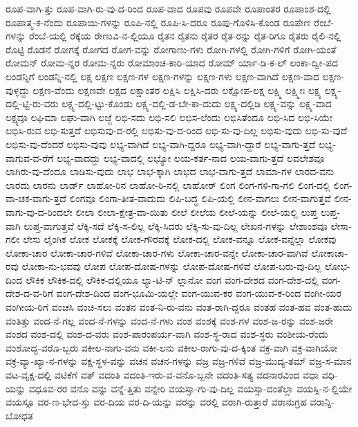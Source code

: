 {ರೂಪ-ವಾಗಿ-ತ್ತು
ರೂಪ-ವಾಗಿ-ರು-ವು-ದ-ರಿಂದ
ರೂಪ-ವಾದ
ರೂಪವು
ರೂಪವೇ
ರೂಪಾಂತರ
ರೂಪಾಂಶ-ದಲ್ಲಿ
ರೂಪಾತ್ಮ-ಕ-ನೆಂದು
ರೂಪಾಯಿ-ಗಳನ್ನು
ರೂಪಿ-ನಲ್ಲಿ
ರೂಪಿ-ಸಿ-ದರೂ
ರೂಪು-ಗೊಳಿಸಿ-ಕೊಂಡ
ರೂಪೇಣ
ರೆಂಬೆ-ಗಳನ್ನು
ರೆಂಬೆ-ಯಲ್ಲಿ
ರೆಕ್ಕೆಯ
ರೇಣುವಿ-ನ-ಲ್ಲಿಯೂ
ರೈತನ
ರೈತನು
ರೈತರ
ರೈತ-ರನ್ನು
ರೈತ-ರಿಗೂ
ರೈತರು
ರೈಲಿ-ನಲ್ಲಿ
ರೊಟ್ಟಿ
ರೊಡನೆ
ರೋಗಕ್ಕೆ
ರೋಗದ
ರೋಗ-ವನ್ನು
ರೋಗಾಣು-ಗಳು
ರೋಗಿ-ಗಳಲ್ಲಿ
ರೋಗಿ-ಗಳಿಗೆ
ರೋಗಿ-ಯಂತೆ
ರೋಮನ್
ರೋಮ-ನ್ನರ
ರೋಮ-ನ್ನರು
ರೋಮಾಂಚ-ಕಾರಿ-ಯಾದ
ರೋಮ್
ರ್ಯಾ-ಡಿ-ಕ-ಲ್
ಲಂಕಾ-ದ್ವೀ-ಪದ
ಲಂಡನ್ನಿಗೆ
ಲಂಡನ್ನಿ-ನಲ್ಲಿ
ಲಕ್ಷ
ಲಕ್ಷಣ
ಲಕ್ಷಣ-ಗಳ
ಲಕ್ಷಣ-ಗಳನ್ನು
ಲಕ್ಷಣ-ಗಳು
ಲಕ್ಷಣ-ವಾಗಿದೆ
ಲಕ್ಷಣ-ವಾದ
ಲಕ್ಷಣ-ವುಳ್ಳದ್ದು
ಲಕ್ಷಣ-ವೆಂದು
ಲಕ್ಷಣವೇ
ಲಕ್ಷದ
ಲಕ್ಷಾಂತರ
ಲಕ್ಷಿಸಿ
ಲಕ್ಷಿಸಿ-ದರು
ಲಕ್ಷೋಪ-ಲಕ್ಷ
ಲಕ್ಷ್ಮಿ
ಲಕ್ಷ್ಮೀಃ
ಲಕ್ಷ್ಯ
ಲಕ್ಷ್ಯ-ದಲ್ಲಿ-ಟ್ಟಿ-ರು-ವರು
ಲಕ್ಷ್ಯ-ದಲ್ಲಿ-ಟ್ಟು-ಕೊಂಡು
ಲಕ್ಷ್ಯ-ದಲ್ಲಿ-ಡ-ಬೇ-ಕಾ-ದುದು
ಲಕ್ಷ್ಯ-ದಲ್ಲಿಡಿ
ಲಕ್ಷ್ಯ-ವನ್ನು
ಲಕ್ಷ್ಯ-ವಾದ
ಲಕ್ಷ್ಯವೂ
ಲಘಿಮಾ
ಲಘು-ವಾಗಿ
ಲಜ್ಜೆ
ಲಭಿ-ಸದು
ಲಭಿ-ಸಲಿ
ಲಭಿಸ-ಲೆಂದು
ಲಭಿಸಿತೆಂದೂ
ಲಭಿ-ಸಿದ
ಲಭಿ-ಸಿಯೇ
ಲಭಿಸಿ-ರುವ
ಲಭಿ-ಸುತ್ತದೆ
ಲಭಿಸುವು-ದ-ರಲ್ಲಿ
ಲಭಿಸು-ವು-ದ-ರಿಂದ
ಲಭಿ-ಸು-ವು-ದಿಲ್ಲ
ಲಭಿಸು-ವುದು
ಲಭಿ-ಸು-ವುದೆ
ಲಭಿಸು-ವು-ದೆಂದರೆ
ಲಭಿಸು-ವುವು
ಲಭ್ಯ-ವಾಗಿದೆ
ಲಭ್ಯ-ವಾಗಿ-ದ್ದರೂ
ಲಭ್ಯ-ವಾಗಿ-ದ್ದಾರೆ
ಲಭ್ಯ-ವಾಗು-ತ್ತದೆ
ಲಭ್ಯ-ವಾಗುವ-ವ-ರೆಗೆ
ಲಭ್ಯ-ವಾದದ್ದು
ಲಭ್ಯ-ವಾದಲ್ಲಿ
ಲಭ್ಯೋ
ಲಯ-ಕರ್ತ-ನಾದ
ಲಯ-ವಾಗು-ತ್ತದೆ
ಲವಲೇಶವೂ
ಲಾಗಿರು-ವು-ದೆಂದೂ
ಲಾಡಿಸು-ವುದು
ಲಾಭ
ಲಾಭ-ಕ್ಕಾಗಿ
ಲಾಭದ
ಲಾಭ-ವಾಗು-ತ್ತದೆ
ಲಾಮಾ-ಗಳ
ಲಾರದ-ವನು
ಲಾರದು
ಲಾರನು
ಲಾರ್ಡ್
ಲಾಹೋ-ರಿನ
ಲಾಹೋ-ರಿ-ನಲ್ಲಿ
ಲಾಹೋರ್
ಲಿಂಗ
ಲಿಂಗ-ಗಳಿ-ಗಾ-ಗಲಿ
ಲಿಂಗ-ದಲ್ಲಿ
ಲಿಂಗ-ವಾ-ಚಕ-ವಾಗು-ತ್ತದೆ
ಲಿಂಗವೂ
ಲಿಂಗಾ-ತೀತ-ವಾದುದು
ಲಿಪಿ-ಬದ್ಧ
ಲಿಪಿ-ಯಲ್ಲಿ
ಲೀನ-ವಾಗಲು
ಲೀನ-ವಾಗುತ್ತವೆ
ಲೀನ-ವಾಗು-ವು-ದ-ರಿಂದಲೇ
ಲೀಲಾ
ಲೀಲಾ-ಕ್ಷೇತ್ರ-ವಾ-ಯಿತು
ಲೀಲೆ
ಲೀಲೆಯ
ಲೀಲೆ-ಯನ್ನು
ಲೀಲೆ-ಯಲ್ಲಿ
ಲುಪ್ತ
ಲುಪ್ತ-ವಾಗಿ
ಲುಪ್ತ-ವಾಗುತ್ತವೆ
ಲೆಕ್ಕಿ-ಸದೆ
ಲೆಕ್ಕಿ-ಸ-ಲಿಲ್ಲ
ಲೆಕ್ಕಿ-ಸಿದರು
ಲೆಕ್ಕಿ-ಸು-ವು-ದಿಲ್ಲ
ಲೇಖನ-ಗಳನ್ನು
ಲೇಶಾಂಶವೂ
ಲೇಸಾ-ಗಲೀ
ಲೇಸು
ಲೈಂಗಿಕ
ಲೋಕ
ಲೋಕಕ್ಕೆ
ಲೋಕ-ಗೌರವಕ್ಕೆ
ಲೋಕ-ದಲ್ಲಿ
ಲೋಕ-ವನ್ನೂ
ಲೋಕ-ವನ್ನೆಲ್ಲಾ
ಲೋಕವು
ಲೋಕಾ-ಚಾರ
ಲೋಕಾ-ಚಾರ-ಗಳಿವೆ
ಲೋಕಾ-ಚಾರ-ಗಳು
ಲೋಕಾ-ಚಾರ-ವನ್ನೇ
ಲೋಕಾ-ಚಾರ-ವಾಗಿವೆ
ಲೋಕಾಚಾ-ರವು
ಲೋಕಾ-ನು-ಭವವು
ಲೋಪ
ಲೋಪ-ದೋಷ-ಗಳನ್ನು
ಲೋಪ-ದೋಷ-ಗಳಿವೆ
ಲೋಪ-ಬರು-ವು-ದಿಲ್ಲ
ಲೋಭ-ದಿಂದ
ಲೌಕಿಕ
ಲೌಕಿಕ-ದಲ್ಲಿ
ಲೌಕಿಕ-ದಲ್ಲಿಯೂ
ಲ್ಯಾ-ಟಿ-ನ್
ಲ್ಲಾನೋ
ವಂಗ
ವಂಗ-ದೇಶದ
ವಂಗ-ದೇಶ-ದಲ್ಲಿ
ವಂಗ-ದೇಶ-ದ-ವ-ರಿಗೆ
ವಂಗ-ದೇಶ-ದಿಂದ
ವಂಗ-ಭೂಮಿ-ಯಲ್ಲೇ
ವಂಗ-ಯುವ-ಕರ
ವಂಗ-ಯುವ-ಕ-ರಿಂದ
ವಂಗೀ-ಯರ
ವಂಗೀಯ-ರಿಗೆ
ವಂಚಸಿ
ವಂಚಿ-ಸಲು
ವಂತನ
ವಂತ-ನಿ-ರು-ವನು
ವಂತ-ರಾಗಿ-ದ್ದರೂ
ವಂತಹ
ವಂತ-ಹವ
ವಂತ-ಹುದು
ವಂತಿತ್ತು
ವಂದ-ನೆ-ಗಲ್ಲ
ವಂದ-ನೆ-ಗಳನ್ನು
ವಂದ-ನೆ-ಗಳು
ವಂಶ
ವಂಶಕ್ಕೆ
ವಂಶ-ಗಳ
ವಂಶ-ಜ-ರನ್ನು
ವಂಶ-ಜರೇ
ವಂಶದ
ವಂಶ-ದಲ್ಲಿ
ವಂಶ-ದ-ವರು
ವಂಶ-ಪಾರಂಪರ್ಯ-ವಾಗಿ
ವಂಶ-ಸ್ಥ-ರಾದ
ವಂಶ-ಸ್ಥರು
ವಂಶೀಯ-ರೆಂದು
ವಂಶೋದ್ಭ-ವರೊ-ಬ್ಬರು
ವಕೀಲ-ನಾಗು-ವನು
ವಕೀ-ಲನು
ವಕೀಲ-ರಾಗು-ವು-ದ-ಕ್ಕಿಂತ
ವಕ್ರ-ವಾಗಿ
ವಕ್ರ-ವಾಗಿಯೋ
ವಕ್ರ-ವ್ಯಾ-ಖ್ಯಾ-ನ-ಗಳನ್ನು
ವಕ್ಷ-ಸ್ಥಳ-ವನ್ನು
ವಚನ
ವಚನ-ಗಳನ್ನು
ವಜ್ರ
ವಜ್ರ-ಗಳಿವೆ
ವಜ್ರ-ಮುದ್ಯ-ತಮ್
ವಜ್ರ-ಸ-ಮಾನ
ವಟ-ವೃಕ್ಷ-ದಲ್ಲಿ
ವಟಿಕೆಗೆ
ವತ್
ವದಂತಿ
ವದಂತಿ-ಇರು-ವ-ವನೊ-ಬ್ಬನೇ
ವದಂತಿ-ಸತ್ಯ
ವದನಾರವಿಂದ
ವಧಾ
ವಧಿ-ಯನ್ನು
ವಧೂವ-ರರ
ವನೊ
ವನ್ನು
ವನ್ನೆ-ತ್ತಿತು
ವನ್ನೇರಿ
ವಯಸ್ಸಾ-ಗು-ವು-ದಿಲ್ಲ
ವಯಸ್ಸಾ-ದಂತೆಲ್ಲಾ
ವಯಸ್ಸಿ-ನ-ಲ್ಲಿಯೇ
ವಯಸ್ಸೂ
ವರ-ಣ-ಭೇದ-ಸ್ತು
ವರ-ದಿಯ
ವರ-ದಿ-ಯನ್ನು
ವರನ್ನು
ವರಲ್ಲಿ
ವರಾಗಿ-ರುತ್ತಾರೆ
ವರಾನುಗ್ರಹ
ವರಾನ್ನಿ-ಬೋಧತ
}
